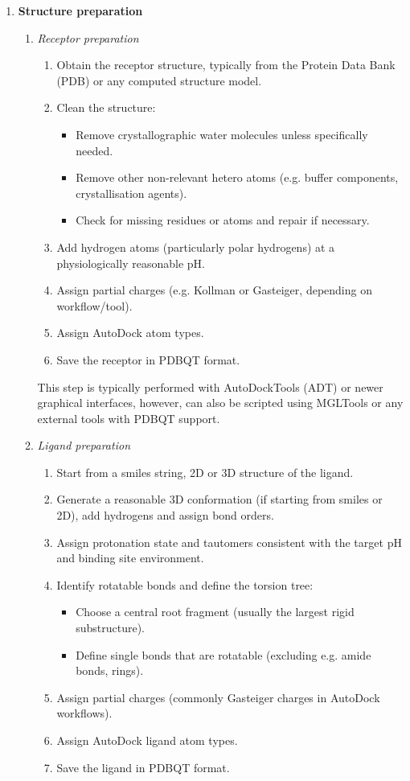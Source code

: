 \documentclass[12pt, a4paper]{article}
\begin{document}
\begin{enumerate}
  \item \textbf{Structure preparation}
  \begin{enumerate}

    \item \textit{Receptor preparation}
    \begin{enumerate}
  \item Obtain the receptor structure, typically from the Protein Data Bank (PDB) or any computed structure model.
  \item Clean the structure:
  \begin{itemize}
    \item Remove crystallographic water molecules unless specifically needed.
    \item Remove other non-relevant hetero atoms (e.g. buffer components, crystallisation agents).
    \item Check for missing residues or atoms and repair if necessary.
  \end{itemize}
  \item Add hydrogen atoms (particularly polar hydrogens) at a physiologically reasonable pH.
  \item Assign partial charges (e.g. Kollman or Gasteiger, depending on workflow/tool).
  \item Assign AutoDock atom types.
  \item Save the receptor in PDBQT format.
\end{enumerate}

This step is typically performed with AutoDockTools (ADT) or newer graphical interfaces, however, can also be scripted using MGLTools or any external tools with PDBQT support.

  \item \textit{Ligand preparation}
  \begin{enumerate}
  \item Start from a smiles string, 2D or 3D structure of the ligand.
  \item Generate a reasonable 3D conformation (if starting from smiles or 2D), add hydrogens and assign bond orders.
  \item Assign protonation state and tautomers consistent with the target pH and binding site environment.
  \item Identify rotatable bonds and define the torsion tree:
  \begin{itemize}
    \item Choose a central root fragment (usually the largest rigid substructure).
    \item Define single bonds that are rotatable (excluding e.g. amide bonds, rings).
  \end{itemize}
  \item Assign partial charges (commonly Gasteiger charges in AutoDock workflows).
  \item Assign AutoDock ligand atom types.
  \item Save the ligand in PDBQT format.
\end{enumerate}
\end{enumerate}


\end{enumerate}
\end{document}
